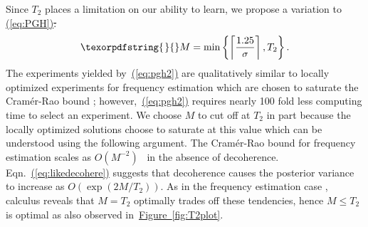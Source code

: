 \documentclass[aps,pra,amsmath,twocolumn,amssymb,superscriptaddress]{revtex4-1}
\newcommand{\eq}[1]{\hyperref[eq:#1]{(\ref*{eq:#1})}}
\newcommand{\fig}[1]{\hyperref[fig:#1]{Figure~\ref*{fig:#1}}}
\providecommand{\DIFaddtex}[1]{{\protect\color{blue}\uwave{#1}}} %
\providecommand{\DIFdeltex}[1]{{\protect\color{red}\sout{#1}}}                      %
\providecommand{\DIFaddbegin}{} %
\providecommand{\DIFaddend}{} %
\providecommand{\DIFdelbegin}{} %
\providecommand{\DIFdelend}{} %
\providecommand{\DIFadd}[1]{\texorpdfstring{\DIFaddtex{#1}}{#1}} %
\providecommand{\DIFdel}[1]{\texorpdfstring{\DIFdeltex{#1}}{}} %
\begin{document}
Since $T_2$ places a limitation on our ability to learn, we propose a variation to \eq{PGH}\DIFdelbegin \DIFdel{:
}\DIFdelend \DIFaddbegin \DIFadd{,
}\DIFaddend \begin{equation}\DIFaddbegin \DIFadd{
    \label{eq:pgh2}
    }\DIFaddend M = \min\left\{\left\lceil\frac{1.25}{\sigma}\right\rceil, T_2 \right\}.
\DIFdelbegin %
\DIFdelend \end{equation}
The experiments yielded by~\eq{pgh2} are qualitatively similar to locally optimized experiments for frequency estimation which are chosen to saturate the Cram\'er-Rao bound \cite{ferrie_how_2013}; however,~\eq{pgh2} requires nearly 100 fold less computing time to select an experiment.
We choose $M$ to cut off at $T_2$ in part because the locally optimized solutions choose to saturate at this value which can be understood using the following argument.  The Cram\'er-Rao bound for frequency estimation scales as $O(M^{-2})$~\cite{WGC15} in the absence of decoherence.  Eqn.~\eq{likedecohere} suggests that decoherence causes the posterior variance to increase as $O(\exp(2M/T_2))$. { As in the frequency estimation case \cite{ferrie_how_2013},} calculus reveals that $M=T_2$ optimally trades off these tendencies, hence $M\le T_2$ is optimal as also observed in~\fig{T2plot}.

\DIFdelbegin %

\end{document}
